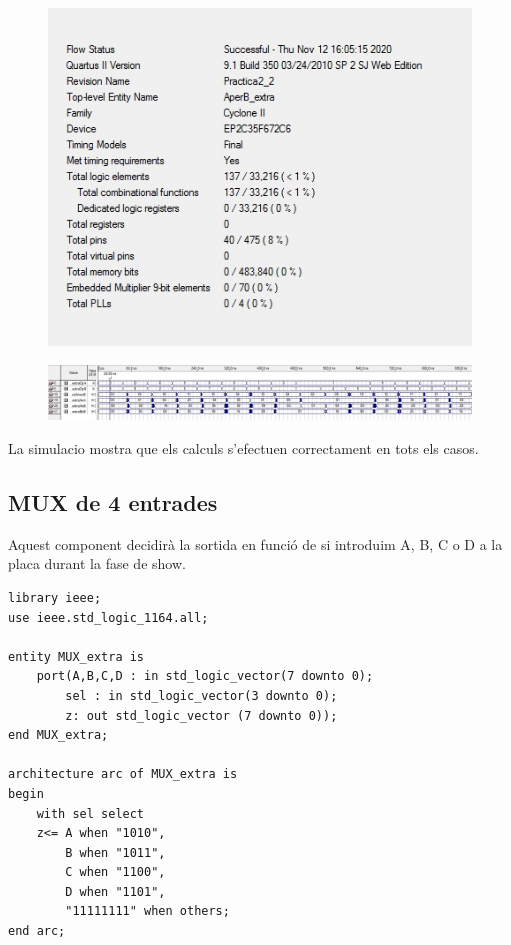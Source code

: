 \documentclass[12pt, a4papre]{article}
\begin{document}
\begin{figure}[H]
		\begin{center}
		\includegraphics[width=130mm]{informeAperBextra.jpeg}
		\end{center}
	\end{figure}
	
	\begin{figure}[H]
		\begin{center}
		\includegraphics[width=130mm]{SimAxBextr.jpeg}
		\end{center}
	\end{figure}
	
	La simulacio mostra que els calculs s'efectuen correctament en tots els casos.
	
	\subsection{MUX de 4 entrades}
	Aquest component decidirà la sortida en funció de si introduim A, B, C o D a la placa durant la fase de show.
	
				\begin{lstlisting}[style=vhdl, frame=single, basicstyle=\tiny]
library ieee;
use ieee.std_logic_1164.all;

entity MUX_extra is 
	port(A,B,C,D : in std_logic_vector(7 downto 0);
		sel : in std_logic_vector(3 downto 0);
		z: out std_logic_vector (7 downto 0));
end MUX_extra;

architecture arc of MUX_extra is
begin
	with sel select 
	z<= A when "1010",
		B when "1011",
		C when "1100",
		D when "1101",
		"11111111" when others;
end arc;
\end{lstlisting}
\end{document}
